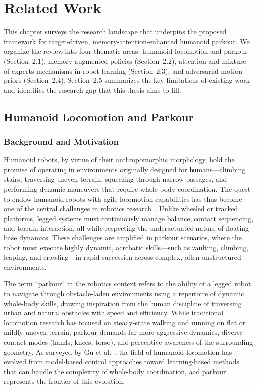 \chapter{Related Work}

This chapter surveys the research landscape that underpins the proposed framework for target-driven, memory-attention-enhanced humanoid parkour. We organize the review into four thematic areas: humanoid locomotion and parkour (Section~2.1), memory-augmented policies (Section~2.2), attention and mixture-of-experts mechanisms in robot learning (Section~2.3), and adversarial motion priors (Section~2.4). Section~2.5 summarizes the key limitations of existing work and identifies the research gap that this thesis aims to fill.

\section{Humanoid Locomotion and Parkour}
\label{sec:rw_locomotion}

\subsection{Background and Motivation}

Humanoid robots, by virtue of their anthropomorphic morphology, hold the promise of operating in environments originally designed for humans---climbing stairs, traversing uneven terrain, squeezing through narrow passages, and performing dynamic maneuvers that require whole-body coordination. The quest to endow humanoid robots with agile locomotion capabilities has thus become one of the central challenges in robotics research~\cite{gu2024humanoidlocomotion}. Unlike wheeled or tracked platforms, legged systems must continuously manage balance, contact sequencing, and terrain interaction, all while respecting the underactuated nature of floating-base dynamics. These challenges are amplified in parkour scenarios, where the robot must execute highly dynamic, acrobatic skills---such as vaulting, climbing, leaping, and crawling---in rapid succession across complex, often unstructured environments.

The term ``parkour'' in the robotics context refers to the ability of a legged robot to navigate through obstacle-laden environments using a repertoire of dynamic whole-body skills, drawing inspiration from the human discipline of traversing urban and natural obstacles with speed and efficiency. While traditional locomotion research has focused on steady-state walking and running on flat or mildly uneven terrain, parkour demands far more aggressive dynamics, diverse contact modes (hands, knees, torso), and perceptive awareness of the surrounding geometry. As surveyed by Gu et al.~\cite{gu2024humanoidlocomotion}, the field of humanoid locomotion has evolved from model-based control approaches toward learning-based methods that can handle the complexity of whole-body coordination, and parkour represents the frontier of this evolution.

